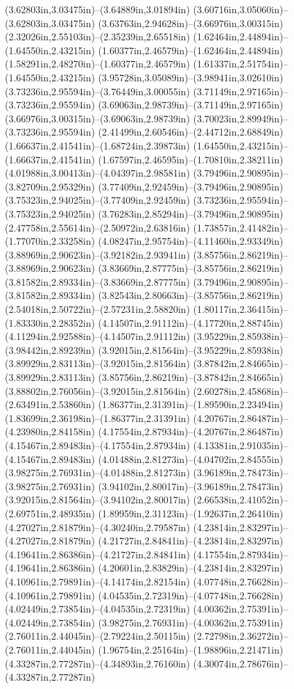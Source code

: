 (3.62803in,3.03475in)--(3.64889in,3.01894in) (3.60716in,3.05060in)--(3.62803in,3.03475in) (3.63763in,2.94628in)--(3.66976in,3.00315in) (2.32026in,2.55103in)--(2.35239in,2.65518in) (1.62464in,2.44894in)--(1.64550in,2.43215in) (1.60377in,2.46579in)--(1.62464in,2.44894in) (1.58291in,2.48270in)--(1.60377in,2.46579in) (1.61337in,2.51754in)--(1.64550in,2.43215in) (3.95728in,3.05089in)--(3.98941in,3.02610in) (3.73236in,2.95594in)--(3.76449in,3.00055in) (3.71149in,2.97165in)--(3.73236in,2.95594in) (3.69063in,2.98739in)--(3.71149in,2.97165in) (3.66976in,3.00315in)--(3.69063in,2.98739in) (3.70023in,2.89949in)--(3.73236in,2.95594in) (2.41499in,2.60546in)--(2.44712in,2.68849in) (1.66637in,2.41541in)--(1.68724in,2.39873in) (1.64550in,2.43215in)--(1.66637in,2.41541in) (1.67597in,2.46595in)--(1.70810in,2.38211in) (4.01988in,3.00413in)--(4.04397in,2.98581in) (3.79496in,2.90895in)--(3.82709in,2.95329in) (3.77409in,2.92459in)--(3.79496in,2.90895in) (3.75323in,2.94025in)--(3.77409in,2.92459in) (3.73236in,2.95594in)--(3.75323in,2.94025in) (3.76283in,2.85294in)--(3.79496in,2.90895in) (2.47758in,2.55614in)--(2.50972in,2.63816in) (1.73857in,2.41482in)--(1.77070in,2.33258in) (4.08247in,2.95754in)--(4.11460in,2.93349in) (3.88969in,2.90623in)--(3.92182in,2.93941in) (3.85756in,2.86219in)--(3.88969in,2.90623in) (3.83669in,2.87775in)--(3.85756in,2.86219in) (3.81582in,2.89334in)--(3.83669in,2.87775in) (3.79496in,2.90895in)--(3.81582in,2.89334in) (3.82543in,2.80663in)--(3.85756in,2.86219in) (2.54018in,2.50722in)--(2.57231in,2.58820in) (1.80117in,2.36415in)--(1.83330in,2.28352in) (4.14507in,2.91112in)--(4.17720in,2.88745in) (4.11294in,2.92588in)--(4.14507in,2.91112in) (3.95229in,2.85938in)--(3.98442in,2.89239in) (3.92015in,2.81564in)--(3.95229in,2.85938in) (3.89929in,2.83113in)--(3.92015in,2.81564in) (3.87842in,2.84665in)--(3.89929in,2.83113in) (3.85756in,2.86219in)--(3.87842in,2.84665in) (3.88802in,2.76056in)--(3.92015in,2.81564in) (2.60278in,2.45868in)--(2.63491in,2.53860in) (1.86377in,2.31391in)--(1.89590in,2.23494in) (1.83699in,2.36198in)--(1.86377in,2.31391in) (4.20767in,2.86487in)--(4.23980in,2.84158in) (4.17554in,2.87934in)--(4.20767in,2.86487in) (4.15467in,2.89483in)--(4.17554in,2.87934in) (4.13381in,2.91035in)--(4.15467in,2.89483in) (4.01488in,2.81273in)--(4.04702in,2.84555in) (3.98275in,2.76931in)--(4.01488in,2.81273in) (3.96189in,2.78473in)--(3.98275in,2.76931in) (3.94102in,2.80017in)--(3.96189in,2.78473in) (3.92015in,2.81564in)--(3.94102in,2.80017in) (2.66538in,2.41052in)--(2.69751in,2.48935in) (1.89959in,2.31123in)--(1.92637in,2.26410in) (4.27027in,2.81879in)--(4.30240in,2.79587in) (4.23814in,2.83297in)--(4.27027in,2.81879in) (4.21727in,2.84841in)--(4.23814in,2.83297in) (4.19641in,2.86386in)--(4.21727in,2.84841in) (4.17554in,2.87934in)--(4.19641in,2.86386in) (4.20601in,2.83829in)--(4.23814in,2.83297in) (4.10961in,2.79891in)--(4.14174in,2.82154in) (4.07748in,2.76628in)--(4.10961in,2.79891in) (4.04535in,2.72319in)--(4.07748in,2.76628in) (4.02449in,2.73854in)--(4.04535in,2.72319in) (4.00362in,2.75391in)--(4.02449in,2.73854in) (3.98275in,2.76931in)--(4.00362in,2.75391in) (2.76011in,2.44045in)--(2.79224in,2.50115in) (2.72798in,2.36272in)--(2.76011in,2.44045in) (1.96754in,2.25164in)--(1.98896in,2.21471in) (4.33287in,2.77287in)--(4.34893in,2.76160in) (4.30074in,2.78676in)--(4.33287in,2.77287in) 